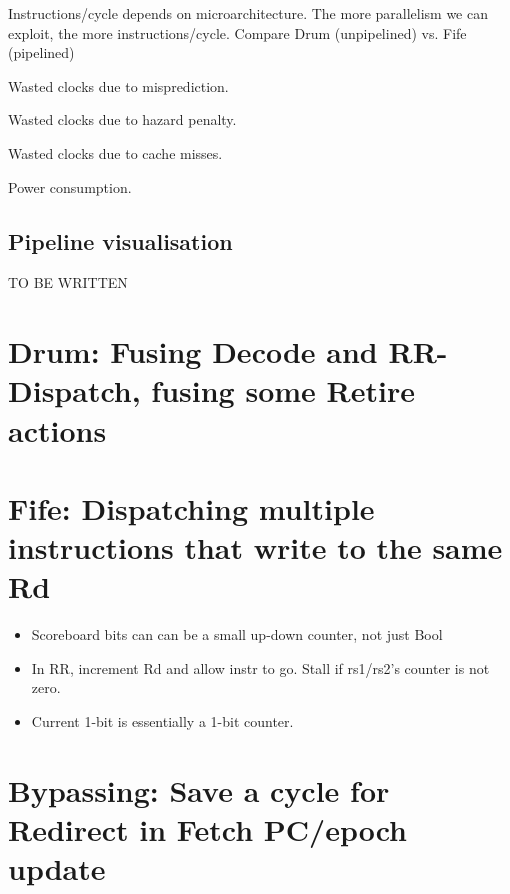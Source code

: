 Instructions/cycle depends on microarchitecture.  The more parallelism
we can exploit, the more instructions/cycle.  Compare Drum
(unpipelined) vs. Fife (pipelined)

Wasted clocks due to misprediction.

Wasted clocks due to hazard penalty.

Wasted clocks due to cache misses.

Power consumption.


\subsection{Pipeline visualisation}

TO BE WRITTEN


\section{Drum: Fusing Decode and RR-Dispatch, fusing some Retire actions}


\section{Fife: Dispatching multiple instructions that write to the same Rd}

\begin{itemize}
 \item Scoreboard bits can can be a small up-down counter, not just Bool
 \item In RR, increment Rd and allow instr to go. Stall if rs1/rs2's counter is not zero.
 \item Current 1-bit is essentially a 1-bit counter.
\end{itemize}


\section{Bypassing: Save a cycle for Redirect in Fetch PC/epoch update}


